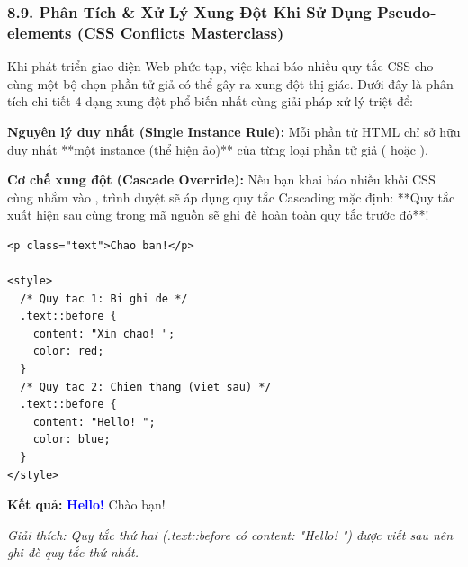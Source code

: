 \subsubsection{8.9. Phân Tích \& Xử Lý Xung Đột Khi Sử Dụng Pseudo-elements (CSS Conflicts Masterclass)}

Khi phát triển giao diện Web phức tạp, việc khai báo nhiều quy tắc CSS cho cùng một bộ chọn phần tử giả có thể gây ra xung đột thị giác. Dưới đây là phân tích chi tiết 4 dạng xung đột phổ biến nhất cùng giải pháp xử lý triệt để:

\begin{conceptBox}
\textbf{Nguyên lý duy nhất (Single Instance Rule):} Mỗi phần tử HTML chỉ sở hữu duy nhất **một instance (thể hiện ảo)** của từng loại phần tử giả ( hoặc ).
\par\vspace{4pt}
\textbf{Cơ chế xung đột (Cascade Override):} Nếu bạn khai báo nhiều khối CSS cùng nhắm vào , trình duyệt sẽ áp dụng quy tắc Cascading mặc định: **Quy tắc xuất hiện sau cùng trong mã nguồn sẽ ghi đè hoàn toàn quy tắc trước đó**!
\end{conceptBox}

\begin{codeWindow}
\begin{lstlisting}[language=HTML5]
<p class="text">Chao ban!</p>

<style>
  /* Quy tac 1: Bi ghi de */
  .text::before {
    content: "Xin chao! ";
    color: red;
  }
  /* Quy tac 2: Chien thang (viet sau) */
  .text::before {
    content: "Hello! ";
    color: blue;
  }
</style>
\end{lstlisting}
\end{codeWindow}

\begin{browserWindow}
\sffamily\small
\textbf{Kết quả:} \textcolor{blue}{\textbf{Hello! }}Chào bạn! \par\vspace{2pt}
{\scriptsize\textcolor{gray!70}{\textit{Giải thích: Quy tắc thứ hai (.text::before có content: "Hello! ") được viết sau nên ghi đè quy tắc thứ nhất.}}}
\end{browserWindow}


